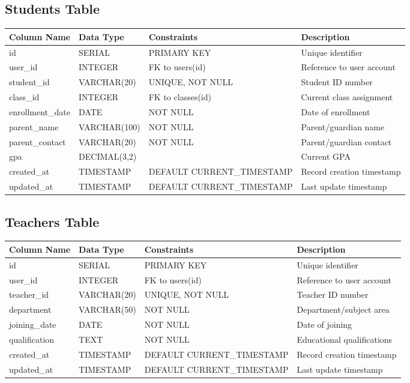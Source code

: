 \documentclass[11pt,a4paper]{article}
\begin{document}
\subsection{Students Table}
\begin{longtable}{|p{3.5cm}|p{2.5cm}|p{3cm}|p{5.5cm}|}
\hline
\textbf{Column Name} & \textbf{Data Type} & \textbf{Constraints} & \textbf{Description} \\
\hline
\endhead
id & SERIAL & PRIMARY KEY & Unique identifier \\
\hline
user\_id & INTEGER & FK to users(id) & Reference to user account \\
\hline
student\_id & VARCHAR(20) & UNIQUE, NOT NULL & Student ID number \\
\hline
class\_id & INTEGER & FK to classes(id) & Current class assignment \\
\hline
enrollment\_date & DATE & NOT NULL & Date of enrollment \\
\hline
parent\_name & VARCHAR(100) & NOT NULL & Parent/guardian name \\
\hline
parent\_contact & VARCHAR(20) & NOT NULL & Parent/guardian contact \\
\hline
gpa & DECIMAL(3,2) & & Current GPA \\
\hline
created\_at & TIMESTAMP & DEFAULT CURRENT\_TIMESTAMP & Record creation timestamp \\
\hline
updated\_at & TIMESTAMP & DEFAULT CURRENT\_TIMESTAMP & Last update timestamp \\
\hline
\end{longtable}

\subsection{Teachers Table}
\begin{longtable}{|p{3.5cm}|p{2.5cm}|p{3cm}|p{5.5cm}|}
\hline
\textbf{Column Name} & \textbf{Data Type} & \textbf{Constraints} & \textbf{Description} \\
\hline
\endhead
id & SERIAL & PRIMARY KEY & Unique identifier \\
\hline
user\_id & INTEGER & FK to users(id) & Reference to user account \\
\hline
teacher\_id & VARCHAR(20) & UNIQUE, NOT NULL & Teacher ID number \\
\hline
department & VARCHAR(50) & NOT NULL & Department/subject area \\
\hline
joining\_date & DATE & NOT NULL & Date of joining \\
\hline
qualification & TEXT & NOT NULL & Educational qualifications \\
\hline
created\_at & TIMESTAMP & DEFAULT CURRENT\_TIMESTAMP & Record creation timestamp \\
\hline
updated\_at & TIMESTAMP & DEFAULT CURRENT\_TIMESTAMP & Last update timestamp \\
\hline
\end{longtable}
\end{document}

